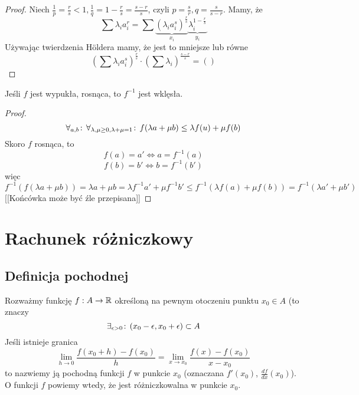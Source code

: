 \documentclass[9pt]{article}
\begin{document}
\begin{proof}
    Niech $\frac{1}{p} = \frac{r}{s} < 1, \frac{1}{q} = 1-\frac{r}{s} = \frac{s-r}{s}$, czyli
    $p = \frac{s}{r}, q = \frac{s}{s-r}$. Mamy, że
    \[
        \sum \lambda_i a_i^r =
        \sum \underbrace{\left(\lambda_i a_i^s\right)^{\frac{r}{s}}}_{x_i} 
        \underbrace{\lambda_i^{1-\frac{r}{s}}}_{y_i}
    \]
    Używając twierdzenia Höldera mamy, że jest to mniejsze lub równe
    \[
        \left(
            \sum \lambda_i a_i^s
        \right)^{\frac{r}{s}}
        \cdot
        \left(
            \sum \lambda_i
        \right)^{\frac{s-r}{s}}
        =
        \left(\right)
    \]
\end{proof}

\begin{Twi}
    Jeśli $f$ jest wypukła, rosnąca, to $f^{-1}$ jest wklęsła.
\end{Twi}

\begin{proof}
    \[
        \forall_{a, b} \! : \, \forall_{\lambda, \mu \ge 0, \lambda + \mu = 1} \! : \,
        f(\lambda a + \mu b)
        \le
        \lambda f(u) + \mu f(b)
    \]
    Skoro $f$ rosnąca, to
    \[
        f (a) = a' \iff a= f^{-1}(a)
    \]
    \[
        f (b) = b' \iff b = f^{-1}(b')
    \]
    więc
    \[
        f^{-1}(f(\lambda a + \mu b)) = \lambda a + \mu b =
        \lambda f^{-1} a' + \mu f^{-1} b' \le
        f^{-1} (\lambda  f(a) + \mu f(b))
        =
        f^{-1} (\lambda  a' + \mu b')
    \]
    [[Końcówka może być źle przepisana]]
\end{proof}

\section{Rachunek różniczkowy}

\subsection{Definicja pochodnej}

\begin{Def}
    Rozważmy funkcję $f: A \to \mathbb{R}$ określoną na pewnym otoczeniu punktu $x_0 \in A$ (to znaczy
    \[
        \exists_{\epsilon > 0} \! : \, (x_0-\epsilon, x_0 + \epsilon) \subset A
    \]
    Jeśli istnieje granica
    \[
        \lim_{h \to 0} \frac{f(x_0+h)-f(x_0)}{h} = \lim_{x \to x_0} \frac{f(x)-f(x_0)}{x-x_0}
    \]
    to nazwiemy ją pochodną funkcji $f$ w punkcie $x_0$ (oznaczana $f'(x_0)$, $\frac{df}{dx}(x_0)$).
    O funkcji $f$ powiemy wtedy, że jest różniczkowalna w punkcie $x_0$.
\end{Def}
\end{document}
